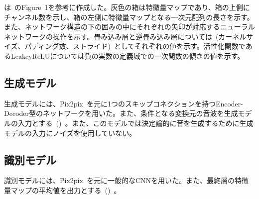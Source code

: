 \clearpage

は~\cite{u-net}のFigure~1を参考に作成した。灰色の箱は特徴量マップであり、箱の上側にチャンネル数を示し、箱の左側に特徴量マップとなる一次元配列の長さを示す。また、ネットワーク構造の下の囲みの中にそれぞれの矢印が対応するニューラルネットワークの操作を示す。畳み込み層と逆畳み込み層については~(カーネルサイズ、パディング数、ストライド)~としてそれぞれの値を示す。活性化関数であるLeakeyReLUについては負の実数の定義域での一次関数の傾きの値を示す。

\subsection{生成モデル}

生成モデルには、Pix2pix~\cite{pix2pix}を元に1つのスキップコネクションを持つEncoder-Decoder型のネットワークを用いた。また、条件となる変換元の音波を生成モデルの入力とする~()~。また、このモデルでは決定論的に音を生成するために生成モデルの入力にノイズを使用していない。

\subsection{識別モデル}

識別モデルには、Pix2pix~\cite{pix2pix}を元に一般的なCNNを用いた。また、最終層の特徴量マップの平均値を出力とする~()~。

